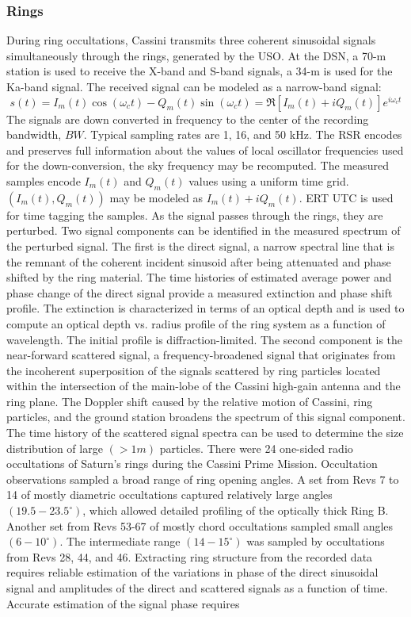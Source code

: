 \documentclass{article}
\begin{document}
            \subsubsection{Rings}
            During ring occultations, Cassini transmits three coherent sinusoidal signals simultaneously through the rings, generated by the USO. At the DSN, a 70-m station is used to receive the X-band and S-band signals, a 34-m is used for the Ka-band signal. The received signal can be modeled as a narrow-band signal:
            \begin{equation}
            s(t) = I_{m}(t)\cos(\omega_{c}t)-Q_{m}(t)\sin(\omega_{c}t) = \Re{[I_{m}(t)+iQ_{m}(t)]e^{i\omega_{c}t}}
            \end{equation}
            The signals are down converted in frequency to the center of the recording bandwidth, $BW$. Typical sampling rates are 1, 16, and 50 kHz. The RSR encodes and preserves full information about the values of local oscillator frequencies used for the down-conversion, the sky frequency may be recomputed. The measured samples encode $I_{m}(t)$ and $Q_{m}(t)$ values using a uniform time grid. $(I_{m}(t),Q_{m}(t))$ may be modeled as $I_{m}(t)+iQ_{m}(t)$. ERT UTC is used for time tagging the samples. As the signal passes through the rings, they are perturbed. Two signal components can be identified in the measured spectrum of the perturbed signal. The first is the direct signal, a narrow spectral line that is the remnant of the coherent incident sinusoid after being attenuated and phase shifted by the ring material. The time histories of estimated average power and phase change of the direct signal provide a measured extinction and phase shift profile. The extinction is characterized in terms of an optical depth and is used to compute an optical depth vs. radius profile of the ring system as a function of wavelength. The initial profile is diffraction-limited. The second component is the near-forward scattered signal, a frequency-broadened signal that originates from the incoherent superposition of the signals scattered by ring particles located within the intersection of the main-lobe of the Cassini high-gain antenna and the ring plane. The Doppler shift caused by the relative motion of Cassini, ring particles, and the ground station broadens the spectrum of this signal component. The time history of the scattered signal spectra can be used to determine the size distribution of large $(>1m)$ particles. There were 24 one-sided radio occultations of Saturn's rings during the Cassini Prime Mission. Occultation observations sampled a broad range of ring opening angles. A set from Revs 7 to 14 of mostly diametric occultations captured relatively large angles $(19.5-23.5^{\circ})$, which allowed detailed profiling of the optically thick Ring B. Another set from Revs 53-67 of mostly chord occultations sampled small angles $(6-10^{\circ})$. The intermediate range $(14-15^{\circ})$ was sampled by occultations from Revs 28, 44, and 46. Extracting ring structure from the recorded data requires reliable estimation of the variations in phase of the direct sinusoidal signal and amplitudes of the direct and scattered signals as a function of time. Accurate estimation of the signal phase requires 
\end{document}
